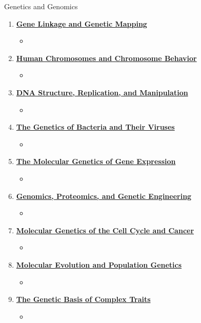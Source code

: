 \documentclass[12pt,letterpaper]{article}
\begin{document}
\begin{chapbox}{Genetics and Genomics}
{\begin{enumerate}[font=\bfseries, wide]
\begin{itemize}
    \end{itemize}
    \item \hyperlink{4}{\textbf{Gene Linkage and Genetic Mapping}}
    \begin{itemize}
        \item 
    \end{itemize}
    \item \hyperlink{5}{\textbf{Human Chromosomes and Chromosome Behavior}}
    \begin{itemize}
        \item 
    \end{itemize}
    \item \hyperlink{6}{\textbf{DNA Structure, Replication, and Manipulation}}
    \begin{itemize}
        \item 
    \end{itemize}
    \item \hyperlink{7}{\textbf{The Genetics of Bacteria and Their Viruses}}
    \begin{itemize}
        \item 
    \end{itemize}
    \item \hyperlink{8}{\textbf{The Molecular Genetics of Gene Expression}}
    \begin{itemize}
        \item 
    \end{itemize}
    \item \hyperlink{10}{\textbf{Genomics, Proteomics, and Genetic Engineering}}
    \begin{itemize}
        \item 
    \end{itemize}
    \item \hyperlink{13}{\textbf{Molecular Genetics of the Cell Cycle and Cancer}}
    \begin{itemize}
        \item 
    \end{itemize}    
    \item \hyperlink{14}{\textbf{Molecular Evolution and Population Genetics}}
    \begin{itemize}
        \item 
    \end{itemize}
    \item \hyperlink{15}{\textbf{The Genetic Basis of Complex Traits}}
    \begin{itemize}
        \item 
    \end{itemize}
\end{enumerate}
}\end{chapbox}
\end{document}
